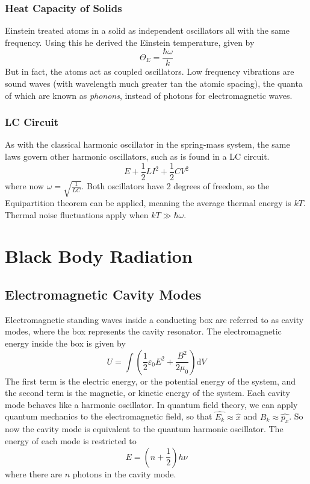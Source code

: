 \documentclass[british]{article}
\renewcommand{\d}{\mathrm{d}} %
\begin{document}
\subsubsection{Heat Capacity of Solids}
Einstein treated atoms in a solid as independent oscillators all with the same frequency. Using this he derived the Einstein temperature, given by
\[
	\Theta_E = \frac{\hbar\omega}{k}
\]
But in fact, the atoms act as coupled oscillators. Low frequency vibrations are sound waves (with wavelength much greater tan the atomic spacing), the quanta of which are known as \emph{phonons}, instead of photons for electromagnetic waves.

\subsubsection{LC Circuit}
As with the classical harmonic oscillator in the spring-mass system, the same laws govern other harmonic oscillators, such as is found in a LC circuit.
\[
	E +\frac{1}{2}LI^2 + \frac{1}{2}CV^2
\]
where now $\omega =\sqrt{\frac{1}{LC}}$. Both oscillators have 2 degrees of freedom, so the Equipartition theorem can be applied, meaning the average thermal energy is $kT$. Thermal noise fluctuations apply when $kT \gg \hbar\omega$.

\section{Black Body Radiation}

\subsection{Electromagnetic Cavity Modes}
Electromagnetic standing waves inside a conducting box are referred to as cavity modes, where the box represents the cavity resonator. The electromagnetic energy inside the box is given by
\[
	U = \int \left(\frac{1}{2}\varepsilon_0 E^2 + \frac{B^2}{2\mu_0}\right) \d{V}
\]
The first term is the electric energy, or the potential energy of the system, and the second term is the magnetic, or kinetic energy of the system. Each cavity mode behaves like a harmonic oscillator. In quantum field theory, we can apply quantum mechanics to the electromagnetic field, so that $\hat{E_k} \approx \hat{x}$ and $\hat{B_k} \approx \hat{p_x}$.  So now the cavity mode is equivalent to the quantum harmonic oscillator. The energy of each mode is restricted to 
\[
	E = \left(n+\frac{1}{2}\right) h\nu
\]
where there are $n$ photons in the cavity mode.
\end{document}
